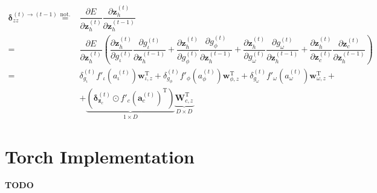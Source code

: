 \documentclass[11pt]{article}
\begin{document}
\begin{equation}
  \begin{split}
    \boldsymbol{\delta}_{zz}^{(t)\rightarrow(t-1)}
    \overset{\text{not.}}{=} &
    \dfrac{\partial E}{\partial \mathbf{z}_h^{(t)}} \dfrac{\partial
      \mathbf{z}_h^{(t)}}{\partial \mathbf{z}_{h}^{(t-1)}}
    \\
     = &
    \dfrac{\partial E}{\partial \mathbf{z}_h^{(t)}}
    \left(
      \dfrac{\partial \mathbf{z}_h^{(t)}}{\partial g_{\iota}^{(t)}}
      \dfrac{\partial g_{\iota}^{(t)}}{\partial \mathbf{z}_h^{(t-1)}}
      +
      \dfrac{\partial \mathbf{z}_h^{(t)}}{\partial g_{\phi}^{(t)}}
      \dfrac{\partial g_{\phi}^{(t)}}{\partial \mathbf{z}_h^{(t-1)}}
      +
      \dfrac{\partial \mathbf{z}_h^{(t)}}{\partial g_{\omega}^{(t)}}
      \dfrac{\partial g_{\omega}^{(t)}}{\partial \mathbf{z}_h^{(t-1)}}
      +
      \dfrac{\partial \mathbf{z}_h^{(t)}}{\partial \mathbf{z}_{c}^{(t)}}
      \dfrac{\partial \mathbf{z}_{c}^{(t)}}{\partial \mathbf{z}_h^{(t-1)}}
    \right)
    \\
    = &
    \delta_{g_{\iota}}^{(t)} f'_{\iota}\left(a_{\iota}^{(t)}\right)
    \mathbf{w}_{\iota, z}^{\text{T}} + \delta_{g_{\phi}}^{(t)}
    f'_{\phi}\left(a_{\phi}^{(t)}\right) \mathbf{w}_{\phi, z}^{\text{T}} +
    \delta_{g_{\omega}}^{(t)} f'_{\omega}\left(a_{\omega}^{(t)}\right)
    \mathbf{w}_{\omega, z}^{\text{T}} + 
    \\ & + \underbrace{\left(\boldsymbol{\delta}_{\mathbf{z}_c}^{(t)} \odot
        {f'_{c}\left(\mathbf{a}_{c}^{(t)}\right)}^{\text{T}}\right)}_{1 \times D} \underbrace{\mathbf{W}_{c, z}^{\text{T}}}_{D \times D}
  \end{split}
\end{equation}

\section{Torch Implementation}
\label{sec:torch}

\textbf{TODO}

\appendix

\printbibliography
\end{document}
